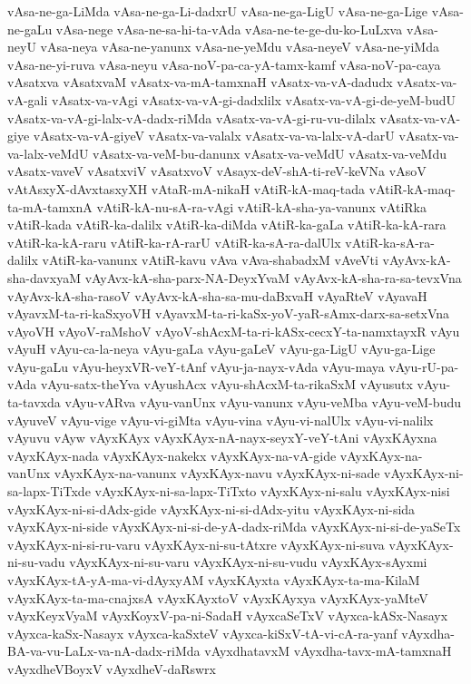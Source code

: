 {vAsa-ne-ga-LiMda
vAsa-ne-ga-Li-dadxrU
vAsa-ne-ga-LigU
vAsa-ne-ga-Lige
vAsa-ne-gaLu
vAsa-nege
vAsa-ne-sa-hi-ta-vAda
vAsa-ne-te-ge-du-ko-LuLxva
vAsa-neyU
vAsa-neya
vAsa-ne-yanunx
vAsa-ne-yeMdu
vAsa-neyeV
vAsa-ne-yiMda
vAsa-ne-yi-ruva
vAsa-neyu
vAsa-noV-pa-ca-yA-tamx-kamf
vAsa-noV-pa-caya
vAsatxva
vAsatxvaM
vAsatx-va-mA-tamxnaH
vAsatx-va-vA-dadudx
vAsatx-va-vA-gali
vAsatx-va-vAgi
vAsatx-va-vA-gi-dadxlilx
vAsatx-va-vA-gi-de-yeM-budU
vAsatx-va-vA-gi-lalx-vA-dadx-riMda
vAsatx-va-vA-gi-ru-vu-dilalx
vAsatx-va-vA-giye
vAsatx-va-vA-giyeV
vAsatx-va-valalx
vAsatx-va-va-lalx-vA-darU
vAsatx-va-va-lalx-veMdU
vAsatx-va-veM-bu-danunx
vAsatx-va-veMdU
vAsatx-va-veMdu
vAsatx-vaveV
vAsatxviV
vAsatxvoV
vAsayx-deV-shA-ti-reV-keVNa
vAsoV
vAtAsxyX-dAvxtasxyXH
vAtaR-mA-nikaH
vAtiR-kA-maq-tada
vAtiR-kA-maq-ta-mA-tamxnA
vAtiR-kA-nu-sA-ra-vAgi
vAtiR-kA-sha-ya-vanunx
vAtiRka
vAtiR-kada
vAtiR-ka-dalilx
vAtiR-ka-diMda
vAtiR-ka-gaLa
vAtiR-ka-kA-rara
vAtiR-ka-kA-raru
vAtiR-ka-rA-rarU
vAtiR-ka-sA-ra-dalUlx
vAtiR-ka-sA-ra-dalilx
vAtiR-ka-vanunx
vAtiR-kavu
vAva
vAva-shabadxM
vAveVti
vAyAvx-kA-sha-davxyaM
vAyAvx-kA-sha-parx-NA-DeyxYvaM
vAyAvx-kA-sha-ra-sa-tevxVna
vAyAvx-kA-sha-rasoV
vAyAvx-kA-sha-sa-mu-daBxvaH
vAyaRteV
vAyavaH
vAyavxM-ta-ri-kaSxyoVH
vAyavxM-ta-ri-kaSx-yoV-yaR-sAmx-darx-sa-setxVna
vAyoVH
vAyoV-raMshoV
vAyoV-shAcxM-ta-ri-kASx-cecxY-ta-namxtayxR
vAyu
vAyuH
vAyu-ca-la-neya
vAyu-gaLa
vAyu-gaLeV
vAyu-ga-LigU
vAyu-ga-Lige
vAyu-gaLu
vAyu-heyxVR-veY-tAnf
vAyu-ja-nayx-vAda
vAyu-maya
vAyu-rU-pa-vAda
vAyu-satx-theYva
vAyushAcx
vAyu-shAcxM-ta-rikaSxM
vAyusutx
vAyu-ta-tavxda
vAyu-vARva
vAyu-vanUnx
vAyu-vanunx
vAyu-veMba
vAyu-veM-budu
vAyuveV
vAyu-vige
vAyu-vi-giMta
vAyu-vina
vAyu-vi-nalUlx
vAyu-vi-nalilx
vAyuvu
vAyw
vAyxKAyx
vAyxKAyx-nA-nayx-seyxY-veY-tAni
vAyxKAyxna
vAyxKAyx-nada
vAyxKAyx-nakekx
vAyxKAyx-na-vA-gide
vAyxKAyx-na-vanUnx
vAyxKAyx-na-vanunx
vAyxKAyx-navu
vAyxKAyx-ni-sade
vAyxKAyx-ni-sa-lapx-TiTxde
vAyxKAyx-ni-sa-lapx-TiTxto
vAyxKAyx-ni-salu
vAyxKAyx-nisi
vAyxKAyx-ni-si-dAdx-gide
vAyxKAyx-ni-si-dAdx-yitu
vAyxKAyx-ni-sida
vAyxKAyx-ni-side
vAyxKAyx-ni-si-de-yA-dadx-riMda
vAyxKAyx-ni-si-de-yaSeTx
vAyxKAyx-ni-si-ru-varu
vAyxKAyx-ni-su-tAtxre
vAyxKAyx-ni-suva
vAyxKAyx-ni-su-vadu
vAyxKAyx-ni-su-varu
vAyxKAyx-ni-su-vudu
vAyxKAyx-sAyxmi
vAyxKAyx-tA-yA-ma-vi-dAyxyAM
vAyxKAyxta
vAyxKAyx-ta-ma-KilaM
vAyxKAyx-ta-ma-cnajxsA
vAyxKAyxtoV
vAyxKAyxya
vAyxKAyx-yaMteV
vAyxKeyxVyaM
vAyxKoyxV-pa-ni-SadaH
vAyxcaSeTxV
vAyxca-kASx-Nasayx
vAyxca-kaSx-Nasayx
vAyxca-kaSxteV
vAyxca-kiSxV-tA-vi-cA-ra-yanf
vAyxdha-BA-va-vu-LaLx-va-nA-dadx-riMda
vAyxdhatavxM
vAyxdha-tavx-mA-tamxnaH
vAyxdheVBoyxV
vAyxdheV-daRswrx
}
